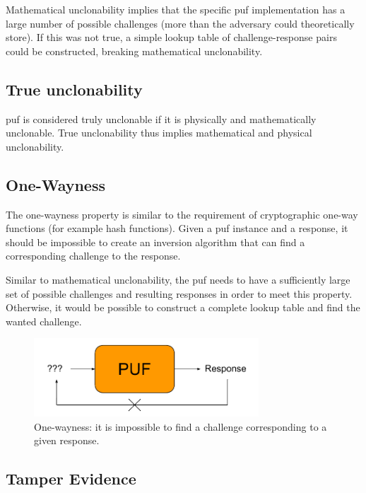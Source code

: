Mathematical unclonability implies that the specific \gls{puf} implementation has a large number of possible challenges (more than the adversary could theoretically store). If this was not true, a simple lookup table of challenge-response pairs could be constructed, breaking mathematical unclonability. %

\subsection*{True unclonability}

\gls{puf} is considered truly unclonable if it is physically and mathematically unclonable. True unclonability thus implies mathematical and physical unclonability.

\subsection*{One-Wayness}

The one-wayness property is similar to the requirement of cryptographic one-way functions (for example hash functions). Given a \gls{puf} instance and a response, it should be impossible to create an inversion algorithm that can find a corresponding challenge to the response.

Similar to mathematical unclonability, the \gls{puf} needs to have a sufficiently large set of possible challenges and resulting responses in order to meet this property. Otherwise, it would be possible to construct a complete lookup table and find the wanted challenge.

\begin{figure}[h!]
    \centering
    \captionsetup{justification=centering,margin=0.5cm}
    \includegraphics[width=0.75\textwidth]{images/one-wayness}
    \caption{One-wayness: it is impossible to find a challenge corresponding to a given response.}
    \label{fig:one-wayness}
\end{figure}

\subsection*{Tamper Evidence}

